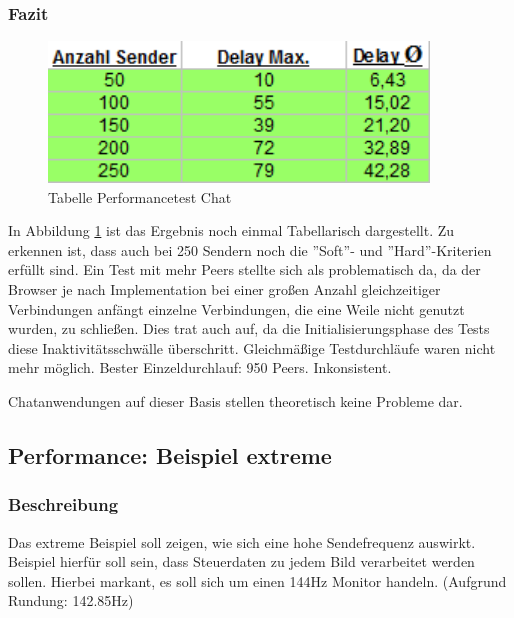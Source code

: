 \subsubsection{Fazit}
\begin{figure}[htH]
\centering
\includegraphics[width=0.9\textwidth]{backend/Tabelle_Performance_Chat.PNG}
\caption{Tabelle Performancetest Chat}
\label{backfig17}
\end{figure}
In Abbildung \ref{backfig17} ist das Ergebnis noch einmal Tabellarisch dargestellt.
Zu erkennen ist, dass auch bei 250 Sendern noch die ''Soft''- und ''Hard''-Kriterien erfüllt sind.
Ein Test mit mehr Peers stellte sich als problematisch da, da der Browser je nach Implementation bei einer großen Anzahl gleichzeitiger Verbindungen anfängt einzelne Verbindungen, die eine Weile nicht genutzt wurden, zu schließen. Dies trat auch auf, da die Initialisierungsphase des Tests diese Inaktivitätsschwälle überschritt. 
Gleichmäßige Testdurchläufe waren nicht mehr möglich.
Bester Einzeldurchlauf: 950 Peers. Inkonsistent.

Chatanwendungen auf dieser Basis stellen theoretisch keine Probleme dar.



\subsection{Performance: Beispiel extreme}
\subsubsection{Beschreibung}
Das extreme Beispiel soll zeigen, wie sich eine hohe Sendefrequenz auswirkt. Beispiel hierfür soll sein, dass Steuerdaten zu jedem Bild verarbeitet werden sollen. Hierbei markant, es soll sich um einen 144Hz Monitor handeln. (Aufgrund Rundung: 142.85Hz)



